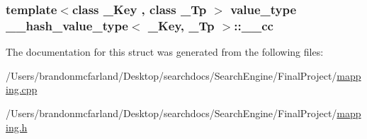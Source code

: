 \subsubsection[{\+\_\+\+\_\+cc}]{\setlength{\rightskip}{0pt plus 5cm}template$<$class \+\_\+\+Key , class \+\_\+\+Tp $>$ {\bf value\+\_\+type} {\bf \+\_\+\+\_\+hash\+\_\+value\+\_\+type}$<$ \+\_\+\+Key, \+\_\+\+Tp $>$\+::\+\_\+\+\_\+cc}\label{struct____hash__value__type_a2ff75e4d342d8e69cdd20e052a87a292}


The documentation for this struct was generated from the following files\+:\begin{DoxyCompactItemize}
\item 
/\+Users/brandonmcfarland/\+Desktop/searchdocs/\+Search\+Engine/\+Final\+Project/\hyperlink{mapping_8cpp}{mapping.\+cpp}\item 
/\+Users/brandonmcfarland/\+Desktop/searchdocs/\+Search\+Engine/\+Final\+Project/\hyperlink{mapping_8h}{mapping.\+h}\end{DoxyCompactItemize}
